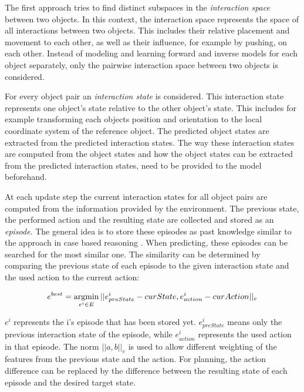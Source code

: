 The first approach tries to find distinct subspaces in the \textit{interaction space} between two objects. In this context, the interaction space represents the space of all interactions between two objects. This includes their relative placement and movement to each other, as well as their influence, for example by pushing, on each other. Instead of modeling and learning forward and inverse models for each object separately, only the pairwise interaction space between two objects is considered.  

For every object pair an \textit{interaction state} is considered. This interaction state represents one object's state relative to the other object's state. This includes for example transforming each objects position and orientation to the local coordinate system of the reference object. %
The predicted object states are extracted from the predicted interaction states. The way these interaction states are computed from the object states and how the object states can be extracted from the predicted interaction states, need to be provided to the model beforehand. %

At each update step the current interaction states for all object pairs are computed from the information provided by the environment. The previous state, the performed action and the resulting state are collected and stored as an \textit{episode}. The general idea is to store these episodes as past knowledge similar to the approach in case based reasoning \cite{cbr}. When predicting, these episodes can be searched for the most similar one. The similarity can be determined by comparing the previous state of each episode to the given interaction state and the used action to the current action:

\begin{equation}
	e^{best} = \argmin_{e^i \in E} ||e^i_{preState}-curState, e^i_{action}-curAction||_e
	\label{eq:bestEpisode}
\end{equation}


$e^i$ represents the i's episode that has been stored yet. $e^i_{preState}$ means only the previous interaction state of the episode, while $e^i_{action}$ represents the used action in that episode.
The norm $||a,b||_e$ is used to allow different weighting of the features from the previous state and the action. For planning, the action difference can be replaced by the difference between the resulting state of each episode and the desired target state.

